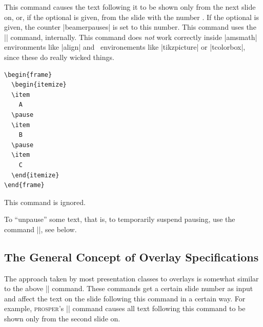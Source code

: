 \begin{command}{\pause{}}
  This command causes the text following it to be shown only from the next slide on, or, if the optional  is given, from the slide with the number . If the optional  is given, the counter |beamerpauses| is set to this number. This command uses the |\onslide| command, internally. This command does \emph{not} work correctly inside |amsmath| environments like |align| and \pgfname\ environements like |tikzpicture| or |tcolorbox|, since these do really wicked things.

  \example
\begin{verbatim}
\begin{frame}
  \begin{itemize}
  \item
    A
  \pause
  \item
    B
  \pause
  \item
    C
  \end{itemize}
\end{frame}
\end{verbatim}

  \articlenote
  This command is ignored.

\end{command}

To ``unpause'' some text, that is, to temporarily suspend pausing, use the command |\onslide|, see below.


\subsection{The General Concept of Overlay Specifications}
\label{section-concept-overlays}

The approach taken by most presentation classes to overlays is somewhat similar to the above |\pause| command. These commands get a certain slide number as input and affect the text on the slide following this command in a certain way. For example, \textsc{prosper}'s || command causes all text following this command to be shown only from the second slide on.

